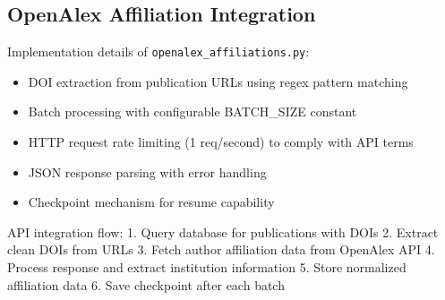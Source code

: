 \subsection{OpenAlex Affiliation Integration}
Implementation details of \texttt{openalex\_affiliations.py}:

\begin{itemize}
    \item DOI extraction from publication URLs using regex pattern matching
    \item Batch processing with configurable BATCH\_SIZE constant
    \item HTTP request rate limiting (1 req/second) to comply with API terms
    \item JSON response parsing with error handling
    \item Checkpoint mechanism for resume capability
\end{itemize}

API integration flow:
1. Query database for publications with DOIs
2. Extract clean DOIs from URLs
3. Fetch author affiliation data from OpenAlex API
4. Process response and extract institution information
5. Store normalized affiliation data
6. Save checkpoint after each batch